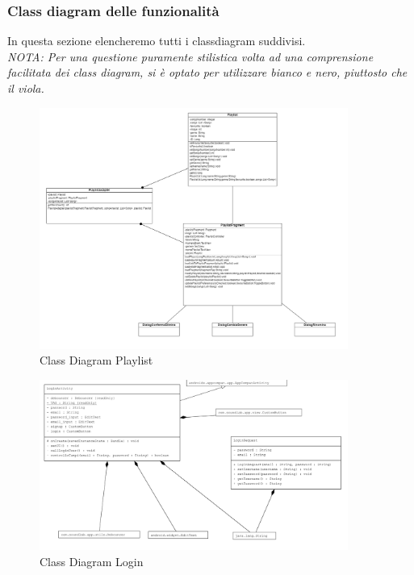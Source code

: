 \documentclass{article}
\begin{document}
			\subsubsection{Class diagram delle funzionalità}
			In questa sezione elencheremo tutti i classdiagram suddivisi.\\
			\textit{NOTA: Per una questione puramente stilistica volta ad una comprensione facilitata dei class diagram, si è optato per utilizzare bianco e nero, piuttosto che il viola.}
			\begin{figure}[H]
				\centering
				\includegraphics[width=0.9\textwidth]{Immagini/classdiagramplaylist}
				\caption{Class Diagram Playlist}
			\end{figure}
			\vspace{0.9cm}
			\begin{figure}[H]
				\centering
				\includegraphics[width=0.9\textwidth]{Immagini/classdiagramlogin}
				\caption{Class Diagram Login}
			\end{figure}
			\vspace{0.9cm}
\end{document}
